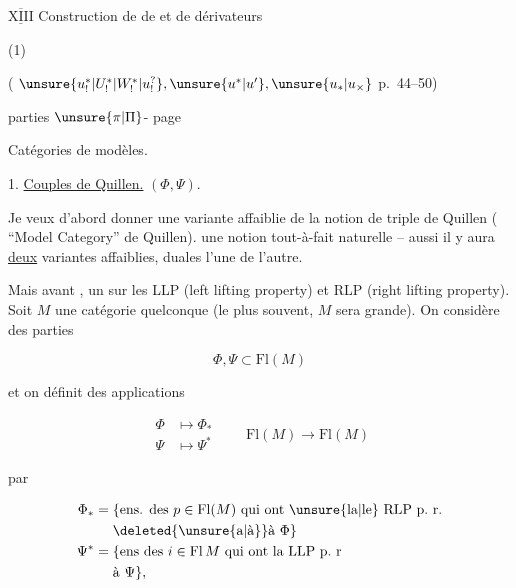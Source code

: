 

\(\underline{\overline{\mathrm{XIII}}}\) Construction de  de  et de dérivateurs

(1)

( $\unsure{u^{\ast}_{!}|U^{\ast}_{!}|W^{\ast}_{!}|u^{?}_{!}},\unsure{u^{\ast}|u'},\unsure{u_{\ast}|u_{\times}}$ p.~44--50)

 parties $\unsure{\pi|\Pi}$- page 




Catégories de modèles.

1. \uline{Couples de Quillen.} $(\Phi,\Psi)$.

Je veux d'abord donner une variante affaiblie de la notion de triple de Quillen ( ``Model Category'' de Quillen).     une notion tout-à-fait naturelle -- aussi il y aura \uline{deux} variantes affaiblies, duales l'une de l'autre.

Mais avant , un  sur les LLP (left lifting property) et RLP (right lifting property). Soit $M$ une catégorie quelconque (le plus souvent, $M$ sera grande). On considère des parties


\[ \Phi,\Psi\subset\mathrm{Fl}(M) \]

et on définit des applications

\[ \boxed{\begin{aligned}\Phi&\longmapsto\Phi_*\\ \Psi&\longmapsto\Psi^*\end{aligned}}\qquad \mathrm{Fl}(M)\longrightarrow\mathrm{Fl}(M) \]

par

\[ \begin{aligned}\Phi_*={}&\{\text{ens. des }p\in\mathrm{Fl}(M)\text{ qui ont \unsure{la|le} RLP p.~r.}\\ &\deleted{\unsure{\text{a}|\text{à}}}\text{à }\Phi\}\\
\Psi^*={}&\{\text{ens des }i\in\mathrm{Fl}\,M\text{ qui ont la LLP p.~r}\\ &\text{à }\Psi\},\end{aligned} \]

